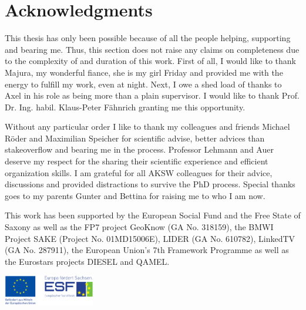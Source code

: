 



\bigskip

\begingroup
\let\clearpage\relax
\let\cleardoublepage\relax
\let\cleardoublepage\relax
\chapter*{Acknowledgments}
This thesis has only been possible because of all the people helping, supporting and bearing me.
Thus, this section does not raise any claims on completeness due to the complexity of and duration of this work.
First of all, I would like to thank Majura, my wonderful fiance, she is my girl Friday and provided me with the energy to fulfill my work, even at night.
Next, I owe a shed load of thanks to Axel in his role as being more than a plain supervisor. 
I would like to thank Prof. Dr. Ing. habil. Klaus-Peter F\"ahnrich granting me this opportunity.

Without any particular order I like to thank my colleagues and friends Michael Röder and Maximilian Speicher for scientific advise, better advices than stakeoverflow and bearing me in the process. 
Professor Lehmann and Auer deserve my respect for the sharing their scientific experience and efficient organization skills. 
I am grateful for all AKSW colleagues for their advice, discussions and provided distractions to survive the PhD process. 
Special thanks goes to my parents Gunter and Bettina for raising me to who I am now. 


\bigskip


This work has been supported by the European Social Fund and the Free State of Saxony as well as the FP7 project GeoKnow (GA No. 318159), the BMWI Project SAKE (Project No. 01MD15006E), LIDER (GA No. 610782), LinkedTV (GA No. 287911), the European Union's 7th Framework Programme as well as the Eurostars projects DIESEL and QAMEL.

\bigskip

\includegraphics[width=0.3\textwidth]{figures/esf.pdf}
\endgroup



